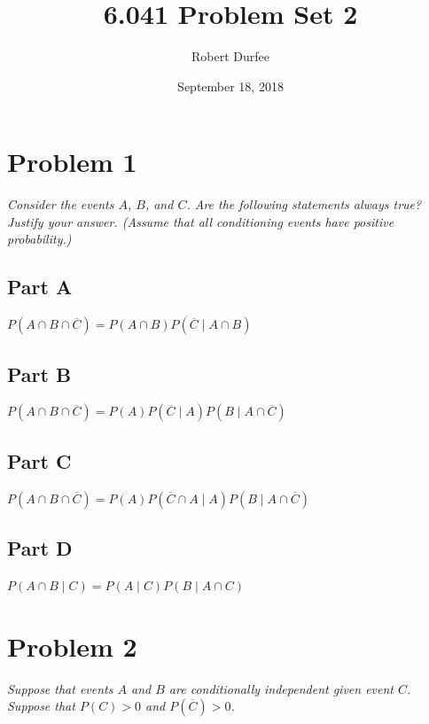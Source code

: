\documentclass{article}
\title{6.041 Problem Set 2}
\author{Robert Durfee}
\date{September 18, 2018}
\begin{document}
\maketitle

\section*{Problem 1}

\textit{Consider the events $ A $, $ B $, and $ C $. Are the following
statements always true? Justify your answer. (Assume that all conditioning
events have positive probability.)}

\subsection*{Part A}

\textit{$ P \left( A \cap B \cap \overline{C} \right) = P \left( A \cap B
\right) P \left( \overline{C} \mid A \cap B \right) $}

\subsection*{Part B}

\textit{$ P \left( A \cap B \cap \overline{C} \right) = P \left( A \right) P
\left( \overline{C} \mid A \right) P \left( B \mid A \cap \overline{C} \right)
$}

\subsection*{Part C}

\textit{$ P \left( A \cap B \cap \overline{C} \right) = P \left( A \right) P
\left( \overline{C} \cap A \mid A \right) P \left( B \mid A \cap \overline{C}
\right) $}

\subsection*{Part D}

\textit{$ P \left( A \cap B \mid C \right) = P \left( A \mid C \right) P \left(
B \mid A \cap C \right) $}

\section*{Problem 2}

\textit{Suppose that events $ A $ and $ B $ are conditionally independent given
event $ C $. Suppose that $ P \left( C \right) > 0 $ and $ P \left( \overline{C}
\right) > 0 $.}
\end{document}
